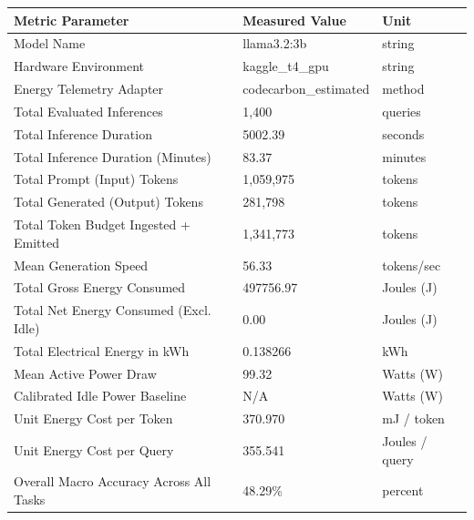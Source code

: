 \begin{tabular}{lll}
\toprule
Metric Parameter & Measured Value & Unit \\
\midrule
Model Name & llama3.2:3b & string \\
Hardware Environment & kaggle\_t4\_gpu & string \\
Energy Telemetry Adapter & codecarbon\_estimated & method \\
Total Evaluated Inferences & 1,400 & queries \\
Total Inference Duration & 5002.39 & seconds \\
Total Inference Duration (Minutes) & 83.37 & minutes \\
Total Prompt (Input) Tokens & 1,059,975 & tokens \\
Total Generated (Output) Tokens & 281,798 & tokens \\
Total Token Budget Ingested + Emitted & 1,341,773 & tokens \\
Mean Generation Speed & 56.33 & tokens/sec \\
Total Gross Energy Consumed & 497756.97 & Joules (J) \\
Total Net Energy Consumed (Excl. Idle) & 0.00 & Joules (J) \\
Total Electrical Energy in kWh & 0.138266 & kWh \\
Mean Active Power Draw & 99.32 & Watts (W) \\
Calibrated Idle Power Baseline & N/A & Watts (W) \\
Unit Energy Cost per Token & 370.970 & mJ / token \\
Unit Energy Cost per Query & 355.541 & Joules / query \\
Overall Macro Accuracy Across All Tasks & 48.29\% & percent \\
\bottomrule
\end{tabular}

